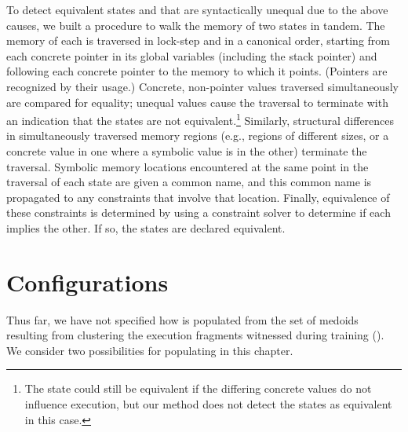 
To detect equivalent states  and
 that are syntactically unequal due to the
above causes, we built a procedure to walk the memory of two
states in tandem.  The memory of each is traversed in lock-step and in
a canonical order, starting from each concrete pointer in its global
variables (including the stack pointer) and following each concrete
pointer to the memory to which it points.  (Pointers are recognized by
their usage.)  Concrete, non-pointer values traversed simultaneously
are compared for equality; unequal values cause the traversal to
terminate with an indication that the states are not
equivalent.\footnote{The state could still be equivalent if the
differing concrete values do not influence execution, but our method
does not detect the states as equivalent in this case.}  Similarly,
structural differences in simultaneously traversed memory regions
(e.g., regions of different sizes, or a concrete value in one where a
symbolic value is in the other) terminate the traversal.  Symbolic
memory locations encountered at the same point in the traversal of
each state are given a common name, and this common name is propagated
to any constraints that involve that location.  Finally, equivalence
of these constraints is determined by using a constraint solver to
determine if each implies the other.  If so, the states are declared
equivalent.

\section{Configurations}
\label{sec:guided:verification:configs}

Thus far, we have not specified how \trainingFrags{\msgNmbr} is
populated from the set \trainingFrags{} of medoids resulting from
clustering the execution fragments witnessed during training
().  We consider two possibilities for populating
\trainingFrags{\msgNmbr} in this chapter.

